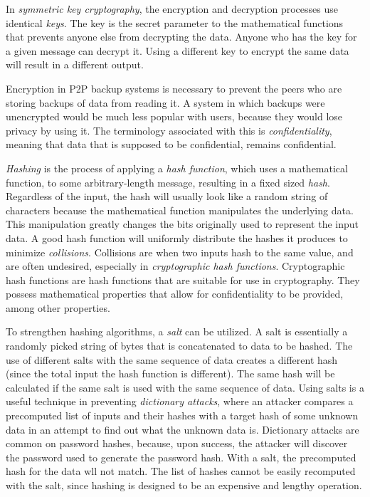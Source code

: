 \documentclass[12pt]{report}
\begin{document}
In \textit{symmetric key cryptography}, the encryption and decryption processes use identical \textit{keys}. The key is the secret parameter to the mathematical functions that prevents anyone else from decrypting the data. Anyone who has the key for a given message can decrypt it. Using a different key to encrypt the same data will result in a different output.

Encryption in P2P backup systems is necessary to prevent the peers who are storing backups of data from reading it. A system in which backups were unencrypted would be much less popular with users, because they would lose privacy by using it. The terminology associated with this is \textit{confidentiality}, meaning that data that is supposed to be confidential, remains confidential.

\textit{Hashing} is the process of applying a \textit{hash function}, which uses a mathematical function, to some arbitrary-length message, resulting in a fixed sized \textit{hash}. Regardless of the input, the hash will usually look like a random string of characters because the mathematical function manipulates the underlying data. This manipulation greatly changes the bits originally used to represent the input data. A good hash function will uniformly distribute the hashes it produces to minimize \textit{collisions}. Collisions are when two inputs hash to the same value, and are often undesired, especially in \textit{cryptographic hash functions}. Cryptographic hash functions are hash functions that are suitable for use in cryptography. They possess mathematical properties that allow for confidentiality to be provided, among other properties.

To strengthen hashing algorithms, a \textit{salt} can be utilized. A salt is essentially a randomly picked string of bytes that is concatenated to data to be hashed. The use of different salts with the same sequence of data creates a different hash (since the total input the hash function is different). The same hash will be calculated if the same salt is used with the same sequence of data. Using salts is a useful technique in preventing \textit{dictionary attacks}, where an attacker compares a precomputed list of inputs and their hashes with a target hash of some unknown data in an attempt to find out what the unknown data is. Dictionary attacks are common on password hashes, because, upon success, the attacker will discover the password used to generate the password hash. With a salt, the precomputed hash for the data wll not match. The list of hashes cannot be easily recomputed with the salt, since hashing is designed to be an expensive and lengthy operation.
\end{document}
